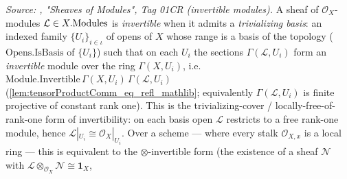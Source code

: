 \begin{definition}\leanok
  \label{def:isInvertible}
  \textit{Source: \cite{stacks-project}, "Sheaves of Modules", Tag 01CR (invertible
  modules).}
  A sheaf of \(\mathcal{O}_X\)-modules \(\mathcal{L} \in X.\mathrm{Modules}\) is
  \emph{invertible} when it admits a \emph{trivializing basis}: an indexed family
  \(\{U_i\}_{i \in \iota}\) of opens of \(X\) whose range is a basis of the
  topology (\(\mathrm{Opens.IsBasis}\) of \(\{U_i\}\)) such that on each \(U_i\)
  the sections \(\Gamma(\mathcal{L}, U_i)\) form an \emph{invertible} module over
  the ring \(\Gamma(X, U_i)\), i.e.
  \(\mathrm{Module.Invertible}\,\Gamma(X,U_i)\,\Gamma(\mathcal{L},U_i)\)
  (\cref{lem:tensorProductComm_eq_refl_mathlib}; equivalently
  \(\Gamma(\mathcal{L},U_i)\) is finite projective of constant rank one). This is
  the trivializing-cover / locally-free-of-rank-one form of invertibility: on each
  basis open \(\mathcal{L}\) restricts to a free rank-one module, hence
  \(\mathcal{L}|_{U_i} \cong \mathcal{O}_X|_{U_i}\). Over a scheme --- where every
  stalk \(\mathcal{O}_{X,x}\) is a local ring --- this is equivalent to the
  \(\otimes\)-invertible form (the existence of a sheaf \(\mathcal{N}\) with
  \(\mathcal{L} \otimes_{\mathcal{O}_X} \mathcal{N} \cong \mathbf{1}_X\),

\end{definition}

